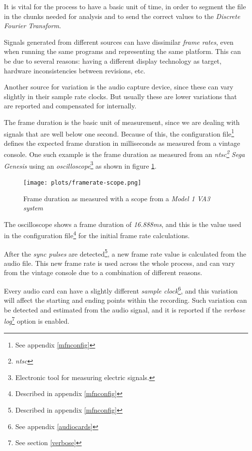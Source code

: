 \documentclass[10pt,a4paper]{report}
\newcommand{\define}[1] {
	\textit{\acrshort{#1}\footnote{\textit{\acrlong{#1}}}}}
\begin{document}
\begin{appendices}
It is vital for the process to have a basic unit of time, in order to segment the file in the chunks needed for analysis and to send the correct values to the \textit{Discrete Fourier Transform}.

Signals generated from different sources can have dissimilar \textit{frame rates}, even when running the same programs and representing the same platform. This can be due to several reasons: having a different display technology as target, hardware inconsistencies between revisions, etc.

Another source for variation is the audio capture device, since these can vary slightly in their sample rate clocks. But usually these are lower variations that are reported and compensated for internally.

The frame duration is the basic unit of measurement, since we are dealing with signals that are well below one second. Because of this, the configuration file\footnote{See appendix \ref{mfnconfig}} defines the expected frame duration in milliseconds as measured from a vintage console. One such example is the frame duration as measured from an \define{ntsc} \textit{Sega Genesis} using an \textit{oscilloscope}\footnote{Electronic tool for measuring electric signals.} as shown in figure \ref{fig:frameratescope}.

\begin{figure}[H]
	\centering
	\texttt{[image: plots/framerate-scope.png]}
	\caption[Scope frame rate]{Frame duration as measured with a scope from a \textit{Model 1 VA3 system}}
	\label{fig:frameratescope}
\end{figure}

The oscilloscope shows a frame duration of \textit{16.888ms}, and this is the value used in the configuration file\footnote{Described in appendix \ref{mfnconfig}} for the initial frame rate calculations.

After the \textit{sync pulses} are detected\footnote{Described in appendix \ref{mfnconfig}}, a new frame rate value is calculated from the audio file. This new frame rate is used across the whole process, and can vary from the vintage console due to a combination of different reasons.

Every audio card can have a slightly different \textit{sample clock}\footnote{See appendix \ref{audiocards}}, and this variation will affect the starting and ending points within the recording. Such variation can be detected and estimated from the audio signal, and it is reported if the \textit{verbose log}\footnote{See section \ref{verbose}} option is enabled.


\end{appendices}
\end{document}
